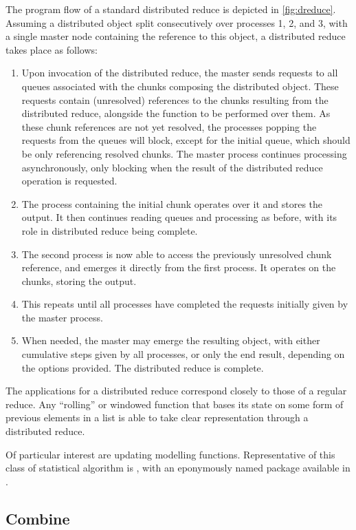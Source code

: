The program flow of a standard distributed reduce is depicted in \cref{fig:dreduce}.
Assuming a distributed object split consecutively over processes 1, 2, and 3, with a single master node containing the reference to this object, a distributed reduce takes place as follows: \begin{enumerate} \item Upon invocation of the distributed reduce, the master sends requests to all queues associated with the chunks composing the distributed object.
	      These requests contain (unresolved) references to the chunks resulting from the distributed reduce, alongside the function to be performed over them.
	      As these chunk references are not yet resolved, the processes popping the requests from the queues will block, except for the initial queue, which should be only referencing resolved chunks.
	      The master process continues processing asynchronously, only blocking when the result of the distributed reduce operation is requested.
	\item The process containing the initial chunk operates over it and stores the output.
	      It then continues reading queues and processing as before, with its role in distributed reduce being complete.
	\item The second process is now able to access the previously unresolved chunk reference, and emerges it directly from the first process.
	      It operates on the chunks, storing the output.
	\item This repeats until all processes have completed the requests initially given by the master process.
	\item When needed, the master may emerge the resulting object, with either cumulative steps given by all processes, or only the end result, depending on the options provided.
	      The distributed reduce is complete.
\end{enumerate}

The applications for a distributed reduce correspond closely to those of a regular reduce.
Any ``rolling'' or windowed function that bases its state on some form of previous elements in a list is able to take clear representation through a distributed reduce.

Of particular interest are updating modelling functions.
Representative of this class of statistical algorithm is , with an eponymously named package available in \R{}.

\subsection{Combine}\label{sec:combine}

